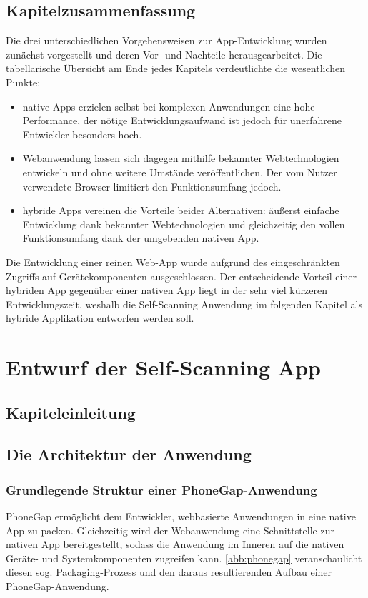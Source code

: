 \section{Kapitelzusammenfassung}
Die drei unterschiedlichen Vorgehensweisen zur App-Entwicklung wurden zunächst vorgestellt und deren Vor- und Nachteile herausgearbeitet. Die tabellarische Übersicht am Ende jedes Kapitels verdeutlichte die wesentlichen Punkte:
\begin{itemize}
	\item native Apps erzielen selbst bei komplexen Anwendungen eine hohe Performance, der nötige Entwicklungsaufwand ist jedoch für unerfahrene Entwickler besonders hoch.
	\item Webanwendung lassen sich dagegen mithilfe bekannter Webtechnologien entwickeln und ohne weitere Umstände veröffentlichen. Der vom Nutzer verwendete Browser limitiert den Funktionsumfang jedoch.
	\item hybride Apps vereinen die Vorteile beider Alternativen: äußerst einfache Entwicklung dank bekannter Webtechnologien und gleichzeitig den vollen Funktionsumfang dank der umgebenden nativen App.
\end{itemize} 

Die Entwicklung einer reinen Web-App wurde aufgrund des eingeschränkten Zugriffs auf Gerätekomponenten ausgeschlossen. Der entscheidende Vorteil einer hybriden App gegenüber einer nativen App liegt in der sehr viel kürzeren Entwicklungszeit, weshalb die Self-Scanning Anwendung im folgenden Kapitel als hybride Applikation entworfen werden soll.

\chapter{Entwurf der Self-Scanning App}
\section{Kapiteleinleitung}

\section{Die Architektur der Anwendung}
\subsection{Grundlegende Struktur einer PhoneGap-Anwendung}
PhoneGap ermöglicht dem Entwickler, webbasierte Anwendungen in eine native App zu packen. Gleichzeitig wird der Webanwendung eine Schnittstelle zur nativen App bereitgestellt, sodass die Anwendung im Inneren auf die nativen Geräte- und Systemkomponenten zugreifen kann. %
\vref{abb:phonegap} veranschaulicht diesen sog. Packaging-Prozess und den daraus resultierenden Aufbau einer PhoneGap-Anwendung.

